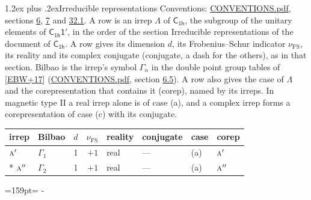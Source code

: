 \documentclass[10pt,a4paper]{article}
\makeatletter
\renewcommand\section{\@startsection{section}{1}{\z@}{-3ex plus -1ex minus -.2ex}%
  {1.2ex plus .2ex}{\normalfont\large\sffamily\bfseries\color{parttitle}}}
\newcommand{\needspace}[1]{\par\penalty-100\begingroup\dimen0=#1\relax\dimen2=\pagegoal
  \advance\dimen2-\pagetotal\ifdim\dimen0>\dimen2\relax\ifdim\dimen2>0pt\vfil\break\fi\fi
  \endgroup}
\numberwithin{equation}{section}
\newcommand{\grp}[1]{\mathsf{#1}}
\newcommand{\irr}[1]{\text{\normalfont\scshape #1}}
\newcommand{\fsind}{\nu_{\mathrm{FS}}}
\makeatother
\begin{document}
\section{Irreducible representations}\label{s:irreps}
Conventions: \href{../../CONVENTIONS.pdf}{CONVENTIONS.pdf}, sections \href{../../../rotation/CONVENTIONS.pdf\#conv.6}{6}, \href{../../../rotation/CONVENTIONS.pdf\#conv.7}{7} and \href{../../CONVENTIONS.pdf\#conv.32.1}{32.1}.
\leavevmode\label{n:irrep.Delta}A row is an irrep $\Lambda$ of $\grp{C_{1h}}$, the subgroup of the unitary elements of $\grp{C_{1h}1'}$, in the order of the section Irreducible representations of the document of \href{../../../rotation/data/pdf/C1h.pdf}{$\grp{C_{1h}}$}. \label{n:index.dimension}\label{n:index.frobenius}\label{n:head.irrep}\label{n:head.reality}\label{n:head.conjugate}A row gives its dimension $d$, its Frobenius--Schur indicator $\fsind$, its reality and its complex conjugate (conjugate, a dash for the others), as in that section. \label{n:head.bilbao}\label{n:irrep.alias.gamma}Bilbao is the irrep's symbol $\Gamma_n$ in the double point group tables of [\href{../../../REFERENCES.pdf\#ref.EBW+17}{EBW+17}] (\href{../../CONVENTIONS.pdf}{CONVENTIONS.pdf}, section \href{../../../rotation/CONVENTIONS.pdf\#conv.6.5}{6.5}). \label{n:head.case.corep}\label{n:head.corep}A row also gives the case of $\Lambda$ and the corepresentation that contains it (corep), named by its irreps. In magnetic type II a real irrep alone is of case (a), and a complex irrep forms a corepresentation of case (c) with its conjugate.
\setlength{\emergencystretch}{2em}\par\setlength{\emergencystretch}{0pt}
{\small\renewcommand{\arraystretch}{1.25}\setlength{\tabcolsep}{4pt}\begin{longtable}{@{}llrrllll@{}}\toprule
irrep & Bilbao & $d$ & $\fsind$ & reality & conjugate & case & corep\\\midrule\endhead
\bottomrule\endfoot\endlastfoot
$\irr{a}'$ & $\Gamma_{1}$ & 1 & $+1$ & real & --- & (a) & $\irr{a}'$\\*
$\irr{a}''$ & $\Gamma_{2}$ & 1 & $+1$ & real & --- & (a) & $\irr{a}''$\\
\bottomrule\end{longtable}}
\needspace{159pt}
\end{document}
